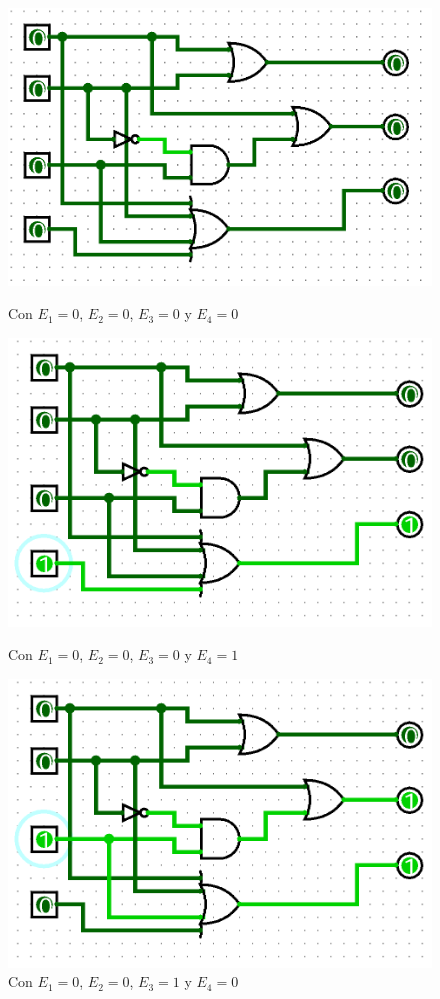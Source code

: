 \begin{figure}
	\centering
    \includegraphics[height = 0.25\textheight]{recursos/Ejercicio4/1ej4.png}\par
    \caption*{Con $E_{1}=0$, $E_{2}=0$, $E_{3}=0$ y $E_{4}=0$}
    \includegraphics[height = 0.25\textheight]{recursos/Ejercicio4/2ej4.png}\par
    \caption*{Con $E_{1}=0$, $E_{2}=0$, $E_{3}=0$ y $E_{4}=1$}
    \includegraphics[height = 0.25\textheight]{recursos/Ejercicio4/3ej4.png}\par
    \caption*{Con $E_{1}=0$, $E_{2}=0$, $E_{3}=1$ y $E_{4}=0$}

\end{figure}
